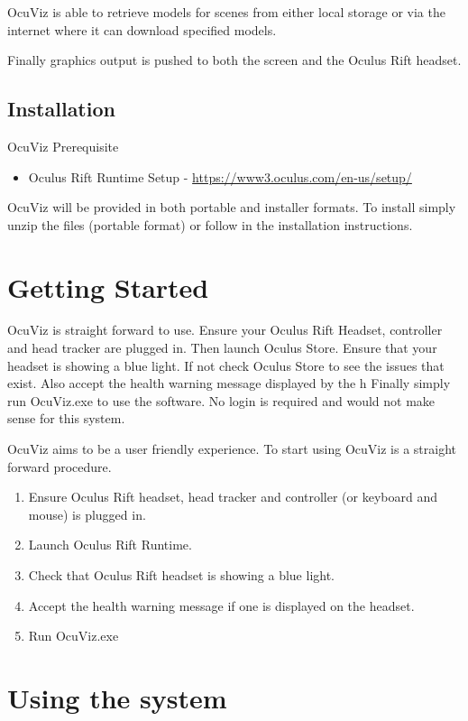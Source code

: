 \documentclass[a4paper,12pt]{article}
\begin{document}
OcuViz is able to retrieve models for scenes from either local storage or via the internet where it can download specified models.

Finally graphics output is pushed to both the screen and the Oculus Rift headset.

\subsection{Installation}
OcuViz Prerequisite
\begin{itemize}
\item Oculus Rift Runtime Setup - \url{https://www3.oculus.com/en-us/setup/}
\end{itemize}

OcuViz will be provided in both portable and installer formats. To install simply unzip the files (portable format) or follow in the installation instructions.

\section{Getting Started}
OcuViz is straight forward to use. Ensure your Oculus Rift Headset, controller and head tracker are plugged in. Then launch Oculus Store. Ensure that your headset is showing a blue light. If not check Oculus Store to see the issues that exist. Also accept the health warning message displayed by the h Finally simply run OcuViz.exe to use the software. No login is required and would not make sense for this system.

OcuViz aims to be a user friendly experience. To start using OcuViz is a straight forward procedure.

\begin{enumerate}
\item Ensure Oculus Rift headset, head tracker and controller (or keyboard and mouse) is plugged in.
\item Launch Oculus Rift Runtime.
\item Check that Oculus Rift headset is showing a blue light. 
\item Accept the health warning message if one is displayed on the headset.
\item Run OcuViz.exe 
\end{enumerate}

\section{Using the system}
\end{document}
